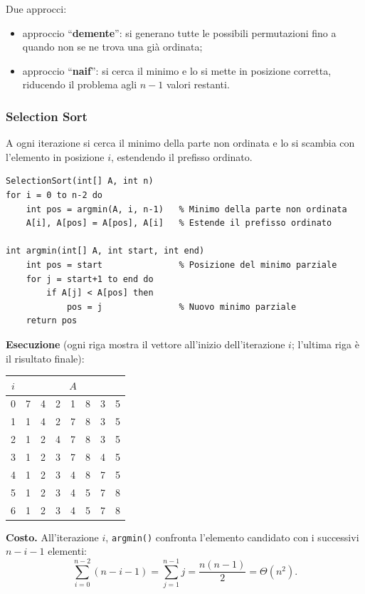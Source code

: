 \documentclass[12pt, a4paper]{article}
\begin{document}
Due approcci:
\begin{itemize}
    \item approccio ``\textbf{demente}'': si generano tutte le possibili permutazioni fino a quando non se ne trova una già ordinata;
    \item approccio ``\textbf{naif}'': si cerca il minimo e lo si mette in posizione corretta, riducendo il problema agli $n-1$ valori restanti.
\end{itemize}

\subsubsection{Selection Sort}

A ogni iterazione si cerca il minimo della parte non ordinata e lo si scambia con l'elemento in posizione $i$, estendendo il prefisso ordinato.
\begin{verbatim}
SelectionSort(int[] A, int n)
for i = 0 to n-2 do
    int pos = argmin(A, i, n-1)   % Minimo della parte non ordinata
    A[i], A[pos] = A[pos], A[i]   % Estende il prefisso ordinato

int argmin(int[] A, int start, int end)
    int pos = start               % Posizione del minimo parziale
    for j = start+1 to end do
        if A[j] < A[pos] then
            pos = j               % Nuovo minimo parziale
    return pos
\end{verbatim}

\textbf{Esecuzione} (ogni riga mostra il vettore all'inizio dell'iterazione $i$; l'ultima riga è il risultato finale):
\begin{center}
\begin{tabular}{c|ccccccc}
\toprule
$i$ & \multicolumn{7}{c}{$A$} \\
\midrule
0 & 7 & 4 & 2 & 1 & 8 & 3 & 5 \\
1 & 1 & 4 & 2 & 7 & 8 & 3 & 5 \\
2 & 1 & 2 & 4 & 7 & 8 & 3 & 5 \\
3 & 1 & 2 & 3 & 7 & 8 & 4 & 5 \\
4 & 1 & 2 & 3 & 4 & 8 & 7 & 5 \\
5 & 1 & 2 & 3 & 4 & 5 & 7 & 8 \\
6 & 1 & 2 & 3 & 4 & 5 & 7 & 8 \\
\bottomrule
\end{tabular}
\end{center}

\textbf{Costo.} All'iterazione $i$, \texttt{argmin()} confronta l'elemento candidato con i successivi $n-i-1$ elementi:
$$\sum_{i=0}^{n-2}(n-i-1) = \sum_{j=1}^{n-1} j = \frac{n(n-1)}{2} = \Theta(n^2).$$
\end{document}
